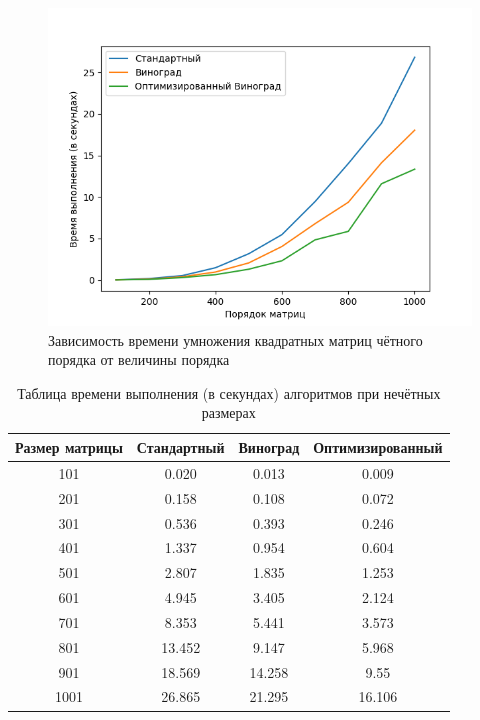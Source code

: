 \documentclass[12pt]{report}
\begin{document}
\begin{figure}[H]
	\centering
	\includegraphics[scale=0.8]{even.png}
	\caption{Зависимость времени умножения квадратных матриц чётного порядка от величины порядка}
	\label{evenGraph}
\end{figure}

\begin{table} [H]
	\label{timeOdd}
	\caption{Таблица времени выполнения (в секундах) алгоритмов при нечётных размерах}
	\begin{center}
		\begin{tabular}{|c c c c|} 
			\hline
			Размер матрицы & Стандартный & Виноград & Оптимизированный \\  
			\hline
			101 & 0.020 & 0.013 & 0.009 \\
			\hline
			201 & 0.158 & 0.108 & 0.072 \\
			\hline
			301 & 0.536 & 0.393 & 0.246 \\
			\hline
			401 & 1.337 & 0.954 & 0.604 \\
			\hline
			501 & 2.807 & 1.835 & 1.253 \\
			\hline
			601 & 4.945 & 3.405 & 2.124 \\
			\hline
			701 & 8.353 & 5.441 & 3.573 \\
			\hline
			801 & 13.452 & 9.147 & 5.968 \\
			\hline
			901 & 18.569 & 14.258 & 9.55 \\
			\hline
			1001 & 26.865 & 21.295 & 16.106 \\
			\hline
		\end{tabular}
	\end{center}
\end{table}
\end{document}
